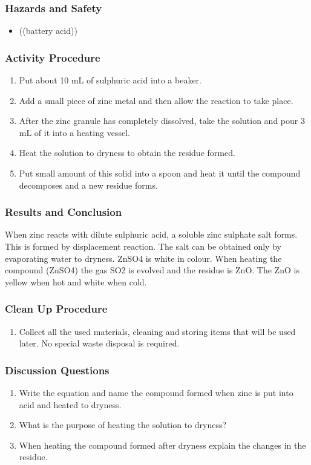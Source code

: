 \subsubsection*{Hazards and Safety}
\begin{itemize}
\item{((battery acid))}
\end{itemize}

\subsubsection*{Activity Procedure}
\begin{enumerate}
\item{Put about 10 mL of sulphuric acid into a beaker.}
\item{Add a small piece of zinc metal and then allow the reaction to take place.}
\item{After the zinc granule has completely dissolved, take the solution and pour 3 mL of it into a heating vessel.}
\item{Heat the solution to dryness to obtain the residue formed.}
\item{Put small amount of this solid into a spoon and heat it until the compound decomposes and a new residue forms.}
\end{enumerate}

\subsubsection*{Results and Conclusion}
When zinc reacts with dilute sulphuric acid, a soluble zinc sulphate salt forms. This is formed by displacement reaction. The salt can be obtained only by evaporating water to dryness. ZnSO4 is white in colour. When heating the compound (ZnSO4) the gas SO2 is evolved and the residue is ZnO. The ZnO is yellow when hot and white when cold.

\subsubsection*{Clean Up Procedure}
\begin{enumerate}
\item{Collect all the used materials, cleaning and storing items that will be used later. No special waste disposal is required.}
\end{enumerate}

\subsubsection*{Discussion Questions}
\begin{enumerate}
\item{Write the equation and name the compound formed when zinc is put into acid and heated to dryness.}
\item{What is the purpose of heating the solution to dryness?}
\item{When heating the compound formed after dryness explain the changes in the residue.}
\end{enumerate}

